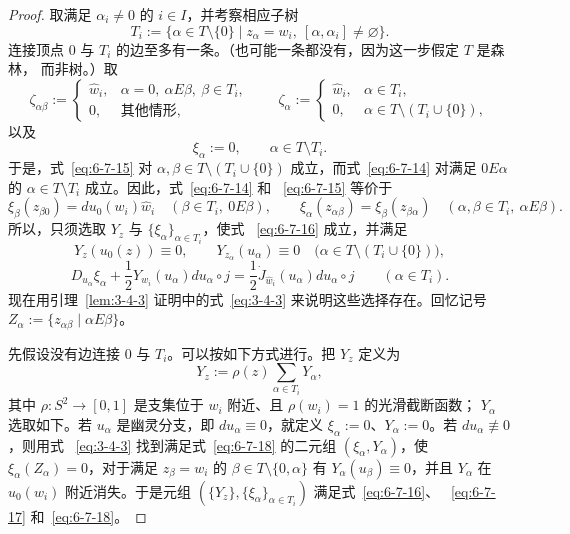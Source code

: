 \begin{proof}
取满足 $\alpha_i\ne0$ 的 $i\in I$，并考察相应子树
\[
  T_i:=\{\alpha\in T\setminus\{0\}\mid
    z_\alpha=w_i,\ [\alpha,\alpha_i]\ne\varnothing\}.
\]
连接顶点 $0$ 与 $T_i$ 的边至多有一条。（也可能一条都没有，因为这一步假定 $T$ 是森林，
而非树。）取
\[
  \zeta_{\alpha\beta}:=
  \begin{cases}
    \widehat w_i,&\alpha=0,\ \alpha E\beta,\ \beta\in T_i,\\
    0,&\text{其他情形},
  \end{cases}
  \qquad
  \zeta_\alpha:=
  \begin{cases}
    \widehat w_i,&\alpha\in T_i,\\
    0,&\alpha\in T\setminus(T_i\cup\{0\}),
  \end{cases}
\]
以及
\[
  \xi_\alpha:=0,
  \qquad \alpha\in T\setminus T_i.
\]
于是，式~\eqref{eq:6-7-15} 对
$\alpha,\beta\in T\setminus(T_i\cup\{0\})$ 成立，而式~\eqref{eq:6-7-14} 对满足
$0E\alpha$ 的 $\alpha\in T\setminus T_i$ 成立。因此，式~\eqref{eq:6-7-14} 和
~\eqref{eq:6-7-15} 等价于
\begin{equation}\label{eq:6-7-16}
  \xi_\beta(z_{\beta0})=du_0(w_i)\widehat w_i
  \quad(\beta\in T_i,\ 0E\beta),
  \qquad
  \xi_\alpha(z_{\alpha\beta})=\xi_\beta(z_{\beta\alpha})
  \quad(\alpha,\beta\in T_i,\ \alpha E\beta).
\end{equation}
所以，只须选取 $Y_z$ 与 $\{\xi_\alpha\}_{\alpha\in T_i}$，使式
~\eqref{eq:6-7-16} 成立，并满足
\begin{equation}\label{eq:6-7-17}
  Y_z(u_0(z))\equiv0,
  \qquad
  Y_{z_\alpha}(u_\alpha)\equiv0
  \quad\bigl(\alpha\in T\setminus(T_i\cup\{0\})\bigr),
\end{equation}
\begin{equation}\label{eq:6-7-18}
  D_{u_\alpha}\xi_\alpha
  +\frac12Y_{w_i}(u_\alpha)du_\alpha\circ j
  =\frac12\dot J_{\widehat w_i}(u_\alpha)du_\alpha\circ j
  \qquad(\alpha\in T_i).
\end{equation}
现在用引理~\ref{lem:3-4-3} 证明中的式~\eqref{eq:3-4-3} 来说明这些选择存在。回忆记号
$Z_\alpha:=\{z_{\alpha\beta}\mid\alpha E\beta\}$。

先假设没有边连接 $0$ 与 $T_i$。可以按如下方式进行。把 $Y_z$ 定义为
\begin{equation}\label{eq:6-7-19}
  Y_z:=\rho(z)\sum_{\alpha\in T_i}Y_\alpha,
\end{equation}
其中 $\rho:S^2\to[0,1]$ 是支集位于 $w_i$ 附近、且 $\rho(w_i)=1$ 的光滑截断函数；
$Y_\alpha$ 选取如下。若 $u_\alpha$ 是幽灵分支，即 $du_\alpha\equiv0$，就定义
$\xi_\alpha:=0$、$Y_\alpha:=0$。若 $du_\alpha\not\equiv0$，则用式
~\eqref{eq:3-4-3} 找到满足式~\eqref{eq:6-7-18} 的二元组
$(\xi_\alpha,Y_\alpha)$，使
$\xi_\alpha(Z_\alpha)=0$，对于满足 $z_\beta=w_i$ 的
$\beta\in T\setminus\{0,\alpha\}$ 有 $Y_\alpha(u_\beta)\equiv0$，并且
$Y_\alpha$ 在 $u_0(w_i)$ 附近消失。于是元组
$(\{Y_z\},\{\xi_\alpha\}_{\alpha\in T_i})$ 满足式~\eqref{eq:6-7-16}、
~\eqref{eq:6-7-17} 和~\eqref{eq:6-7-18}。


\end{proof}
